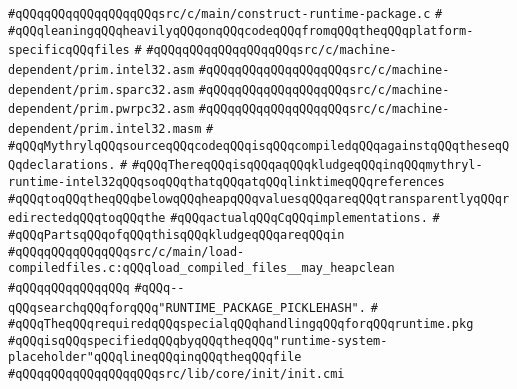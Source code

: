 \verb|#qQQqqQQqqQQqqQQqqQQqsrc/c/main/construct-runtime-package.c|\newline
\verb|#|\newline
\verb|#qQQqleaningqQQqheavilyqQQqonqQQqcodeqQQqfromqQQqtheqQQqplatform-specificqQQqfiles|\newline
\verb|#|\newline
\verb|#qQQqqQQqqQQqqQQqqQQqsrc/c/machine-dependent/prim.intel32.asm|\newline
\verb|#qQQqqQQqqQQqqQQqqQQqsrc/c/machine-dependent/prim.sparc32.asm|\newline
\verb|#qQQqqQQqqQQqqQQqqQQqsrc/c/machine-dependent/prim.pwrpc32.asm|\newline
\verb|#qQQqqQQqqQQqqQQqqQQqsrc/c/machine-dependent/prim.intel32.masm|\newline
\verb|#|\newline
\verb|#qQQqMythrylqQQqsourceqQQqcodeqQQqisqQQqcompiledqQQqagainstqQQqtheseqQQqdeclarations.|\newline
\verb|#|\newline
\verb|#qQQqThereqQQqisqQQqaqQQqkludgeqQQqinqQQqmythryl-runtime-intel32qQQqsoqQQqthatqQQqatqQQqlinktimeqQQqreferences|\newline
\verb|#qQQqtoqQQqtheqQQqbelowqQQqheapqQQqvaluesqQQqareqQQqtransparentlyqQQqredirectedqQQqtoqQQqthe|\newline
\verb|#qQQqactualqQQqCqQQqimplementations.|\newline
\verb|#|\newline
\verb|#qQQqPartsqQQqofqQQqthisqQQqkludgeqQQqareqQQqin|\newline
\verb|#qQQqqQQqqQQqqQQqsrc/c/main/load-compiledfiles.c:qQQqload_compiled_files__may_heapclean|\newline
\verb|#qQQqqQQqqQQqqQQq|\newline
\verb|#qQQq--qQQqsearchqQQqforqQQq"RUNTIME_PACKAGE_PICKLEHASH".|\newline
\verb|#|\newline
\verb|#qQQqTheqQQqrequiredqQQqspecialqQQqhandlingqQQqforqQQqruntime.pkg|\newline
\verb|#qQQqisqQQqspecifiedqQQqbyqQQqtheqQQq"runtime-system-placeholder"qQQqlineqQQqinqQQqtheqQQqfile|\newline
\verb|#qQQqqQQqqQQqqQQqqQQqsrc/lib/core/init/init.cmi|\newline
